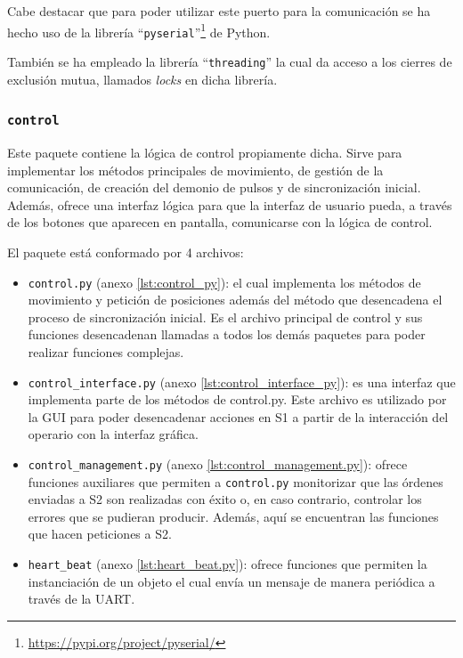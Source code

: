 Cabe destacar que para poder utilizar este puerto para la comunicación se ha hecho uso de la librería ``\texttt{pyserial}''\footnote{\url{https://pypi.org/project/pyserial/}} de Python.

También se ha empleado la librería ``\texttt{threading}'' la cual da acceso a los cierres de exclusión mutua, llamados \textit{locks} en dicha librería.

\subsubsection{\texttt{control}}

Este paquete contiene la lógica de control propiamente dicha. Sirve para implementar los métodos principales de movimiento, de gestión de la comunicación, de creación del demonio de pulsos y de  sincronización inicial. Además, ofrece una interfaz lógica para que la interfaz de usuario pueda, a través de los botones que aparecen en pantalla, comunicarse con la lógica de control.

El paquete está conformado por 4 archivos:

\begin{itemize}
    \item \texttt{control.py} (anexo \ref{lst:control_py}): el cual implementa los métodos de movimiento y petición de posiciones además del método que desencadena el proceso de sincronización inicial. Es el archivo principal de control y sus funciones desencadenan llamadas a todos los demás paquetes para poder realizar funciones complejas.
    \item \texttt{control\_interface.py} (anexo \ref{lst:control_interface_py}): es una interfaz que implementa parte de los métodos de control.py. Este archivo es utilizado por la GUI para poder desencadenar acciones en \ac{S1} a partir de la interacción del operario con la interfaz gráfica.
    \item \texttt{control\_management.py} (anexo \ref{lst:control_management.py}): ofrece funciones auxiliares que permiten a \texttt{control.py} monitorizar que las órdenes enviadas a \ac{S2} son realizadas con éxito o, en caso contrario, controlar los errores que se pudieran producir.
    Además, aquí se encuentran las funciones que hacen peticiones a \ac{S2}.
    \item \texttt{heart\_beat} (anexo \ref{lst:heart_beat.py}): ofrece funciones que permiten la instanciación de un objeto el cual envía un mensaje de manera periódica a través de la UART.
\end{itemize}

